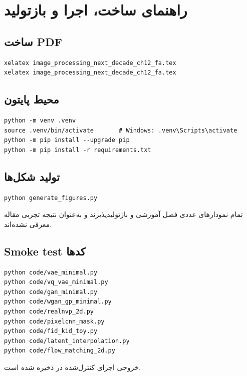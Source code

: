 \documentclass[12pt,openany,oneside]{book}
\begin{document}
\appendix
\chapter{راهنمای ساخت، اجرا و بازتولید}
\section{ساخت PDF}
\begin{latin}
\begin{lstlisting}
xelatex image_processing_next_decade_ch12_fa.tex
xelatex image_processing_next_decade_ch12_fa.tex
\end{lstlisting}
\end{latin}

\section{محیط پایتون}
\begin{latin}
\begin{lstlisting}
python -m venv .venv
source .venv/bin/activate       # Windows: .venv\Scripts\activate
python -m pip install --upgrade pip
python -m pip install -r requirements.txt
\end{lstlisting}
\end{latin}

\section{تولید شکل‌ها}
\begin{latin}
\begin{lstlisting}
python generate_figures.py
\end{lstlisting}
\end{latin}
تمام نمودارهای عددی فصل آموزشی و بازتولیدپذیرند و به‌عنوان نتیجه تجربی مقاله معرفی نشده‌اند.

\section{Smoke test کدها}
\begin{latin}
\begin{lstlisting}
python code/vae_minimal.py
python code/vq_vae_minimal.py
python code/gan_minimal.py
python code/wgan_gp_minimal.py
python code/realnvp_2d.py
python code/pixelcnn_mask.py
python code/fid_kid_toy.py
python code/latent_interpolation.py
python code/flow_matching_2d.py
\end{lstlisting}
\end{latin}
خروجی اجرای کنترل‌شده در  ذخیره شده است.
\end{document}
